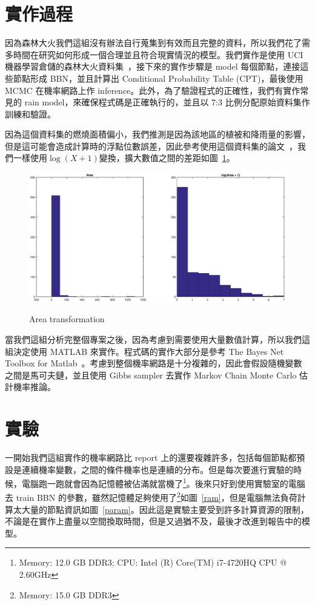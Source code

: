 \documentclass[a4paper]{article}
\begin{document}
\section{實作過程}
因為森林大火我們這組沒有辦法自行蒐集到有效而且完整的資料，所以我們花了需多時間在研究如何形成一個合理並且符合現實情況的模型。我們實作是使用 UCI 機器學習倉儲的森林大火資料集~\cite{UCIFF}，接下來的實作步驟是 model 每個節點，連接這些節點形成 BBN，並且計算出 Conditional Probability Table (CPT)，最後使用 MCMC 在機率網路上作 inference。此外，為了驗證程式的正確性，我們有實作常見的 rain model，來確保程式碼是正確執行的，並且以 7:3 比例分配原始資料集作訓練和驗證。

因為這個資料集的燃燒面積偏小，我們推測是因為該地區的植被和降雨量的影響，但是這可能會造成計算時的浮點位數誤差，因此參考使用這個資料集的論文~\cite{dataset}，我們一樣使用$\log(X+1)$變換，擴大數值之間的差距如圖~\ref{area}。

\begin{figure}[h]
  \caption{Area transformation}
  \centering
  \includegraphics[width=1\textwidth]{area}
  \label{area}
\end{figure}

當我們這組分析完整個專案之後，因為考慮到需要使用大量數值計算，所以我們這組決定使用 MATLAB 來實作。程式碼的實作大部分是參考 The Bayes Net Toolbox for Matlab~\cite{bnet}。考慮到整個機率網路是十分複雜的，因此會假設隨機變數之間是馬可夫鏈，並且使用 Gibbs sampler 去實作 Markov Chain Monte Carlo 估計機率推論。

\section{實驗}
一開始我們這組實作的機率網路比 report 上的還要複雜許多，包括每個節點都預設是連續機率變數，之間的條件機率也是連續的分布。但是每次要進行實驗的時候，電腦跑一跑就會因為記憶體被佔滿就當機了\footnote{Memory: 12.0 GB DDR3; CPU: Intel (R) Core(TM) i7-4720HQ CPU @ 2.60GHz}。後來只好到使用實驗室的電腦去 train BBN 的參數，雖然記憶體足夠使用了\footnote{Memory: 15.0 GB DDR3}如圖~\ref{ram}，但是電腦無法負荷計算太大量的節點資訊如圖~\ref{param}。因此這是實驗主要受到許多計算資源的限制，不論是在實作上盡量以空間換取時間，但是又過猶不及，最後才改進到報告中的模型。
\end{document}
